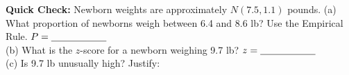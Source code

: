 \documentclass[10pt]{article}
\begin{document}
\vspace{0.08in}

\begin{tcolorbox}[colback=goldbg, colframe=goldacc, boxrule=0.8pt, arc=2mm,
    left=4mm, right=4mm, top=2mm, bottom=2mm]
\small\textbf{Quick Check:} Newborn weights are approximately $N(7.5, 1.1)$ pounds.
(a) What proportion of newborns weigh between 6.4 and 8.6 lb? Use the Empirical Rule.
\hfill $P = \blank{2cm}$\\[4pt]
(b) What is the $z$-score for a newborn weighing 9.7 lb?
\hfill $z = \blank{2cm}$\\[4pt]
(c) Is 9.7 lb unusually high? \blank{2cm} \quad Justify: \blank{6cm}
\end{tcolorbox}
\end{document}
